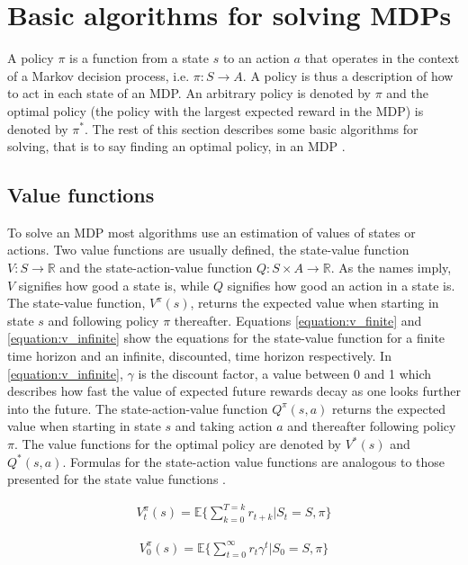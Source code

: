 \section{Basic algorithms for solving MDPs}

A policy $\pi$ is a function from a state $s$ to an action $a$ that operates in
the context of a Markov decision process, i.e. $\pi \colon S \to A$. A policy
is thus a description of how to act in each state of an MDP. An arbitrary
policy is denoted by $\pi$ and the optimal policy (the policy with the largest
expected reward in the MDP) is denoted by $\pi^*$. The rest of this section
describes some basic algorithms for solving, that is to say finding an optimal
policy, in an MDP \parencite{barto1998reinforcement}.

\subsection{Value functions}

To solve an MDP most algorithms use an estimation of values of states or
actions. Two value functions are usually defined, the state-value function $V :
S \to \mathbb R$ and the state-action-value function $Q : S \times A \to
\mathbb R$. As the names imply, $V$ signifies how good a state is, while $Q$
signifies how good an action in a state is. The state-value function,
$V^\pi(s)$, returns the expected value when starting in state $s$ and following
policy $\pi$ thereafter. Equations \eqref{equation:v_finite} and \eqref{equation:v_infinite} show the equations for the state-value function for a finite time horizon and an infinite, discounted, time horizon respectively. In \eqref{equation:v_infinite}, $\gamma$ is the discount factor, a value between 0 and 1 which describes how fast the value of expected future rewards decay as one looks further into the future. The state-action-value function $Q^\pi(s, a)$ returns
the expected value when starting in state $s$ and taking action $a$ and
thereafter following policy $\pi$. The value functions for the optimal policy
are denoted by $V^*(s)$ and $Q^*(s, a)$. Formulas for the state-action value functions are analogous to those presented for the state value functions \parencite{barto1998reinforcement}. 

\begin{align}
\label{equation:v_finite}
V_t^\pi(s) = \mathbb{E} \{ \sum_{k=0}^{T=k} r_{t+k} | S_t = S, \pi \}
\end{align}

\begin{align}
\label{equation:v_infinite}
V_{0}^\pi(s) = \mathbb{E} \{ \sum_{t=0}^\infty r_{t}\gamma^t | S_0 = S,\pi \}
\end{align}

